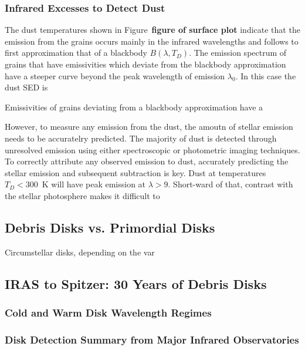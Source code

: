            
            
        \subsubsection{Infrared Excesses to Detect Dust}            
            
        The dust temperatures shown in Figure~\textbf{figure of surface plot} indicate that the emission from the grains occurs mainly in the infrared wavelengths and follows to first approximation that of a blackbody $B(\lambda,T_D)$. The emission spectrum of grains that have emissivities which deviate from the blackbody approximation have a steeper curve beyond the peak wavelength of emission $\lambda_0$. In this case the dust SED is 
        
        Emissivities of grains deviating from a blackbody approximation have a 
        
        
        However, to measure any emission from the dust, the amoutn of stellar emission needs to be accuratelry predicted. The majority of dust is detected through unresolved emission using either spectroscopic or photometric imaging techniques. To correctly attribute any observed emission to dust, accurately predicting the stellar emission and subsequent subtraction is key.  Dust at temperatures $T_D<300$~K will have peak emission at $\lambda>9$\micron. Short-ward of that, contrast with the stellar photosphere makes it difficult to 
            
            
            
    \subsection{Debris Disks vs. Primordial Disks}        
        
        Circumstellar disks, depending on the var
        
        
    \subsection{IRAS to Spitzer: 30 Years of Debris Disks}\label{sec:30years}
    
        \subsubsection{Cold and Warm Disk Wavelength Regimes}

        \subsubsection{Disk Detection Summary from Major Infrared Observatories}\label{sec:IR_observatories}
        
